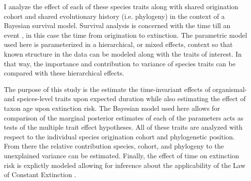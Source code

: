 \documentclass[12pt,letterpaper]{article}
\begin{document}
I analyze the effect of each of these species traits along with shared origination cohort and shared evolutionary history (i.e. phylogeny) in the context of a Bayesian survival model. Survival analysis is concerned with the time till an event \citep{Klein2003}, in this case the time from origination to extinction. The parametric model used here is parameterized in a hierarchical, or mixed effects, context so that known structure in the data can be modeled along with the traits of interest. In that way, the importance and contribution to variance of species traits can be compared with these hierarchical effects.

The purpose of this study is the estimate the time-invariant effects of organismal- and speices-level traits upon expected duration while also estimating the effect of taxon age upon extinction risk. The Bayesian model used here allows for comparison of the marginal posterior estimates of each of the parameters acts as tests of the multiple trait effect hypotheses. All of these traits are analyzed with respect to the individual species origination cohort and phylogenetic position. From there the relative contribution species, cohort, and phylogeny to the unexplained variance can be estimated. Finally, the effect of time on extinction risk is explictly modeled allowing for inference about the applicability of the Law of Constant Extinction \citep{VanValen1973}.
\end{document}
